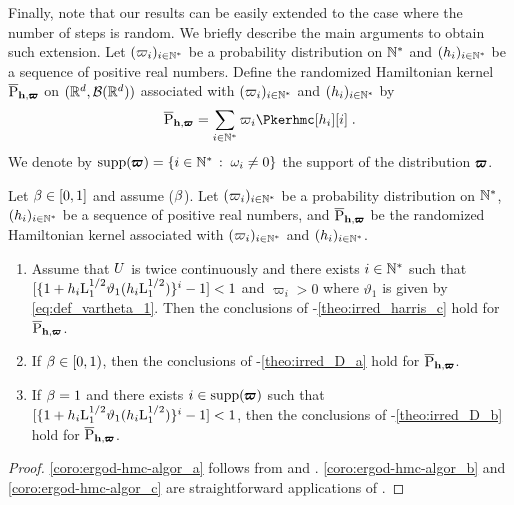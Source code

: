 Finally, note that our results can be easily extended to the case
where the number of steps is random. We briefly describe the main arguments to obtain such
extension.
Let $(\varpi_i)_{i\in \mathbb{N}^*}$ be a probability distribution on $\mathbb{N}^*$ and $(h_i)_{i \in \mathbb{N}^*}$ be a sequence of  positive real
numbers.  Define the randomized Hamiltonian kernel
$\overline{\mathrm{P}}_{\mathbf{h},\pmb{\varpi}}$ on $(\mathbb{R}^d, \mathcal{B}(\mathbb{R}^d))$ associated with $(\varpi_i)_{i\in \mathbb{N}^*}$ and
$(h_i)_{i \in \mathbb{N}^*}$ by
\begin{equation}
\label{eq:randomhmc}
\randomkerhmc_{\mathbf{h},\bfvarpi} = \sum_{i\in \nset^*} \varpi_i \Pkerhmc[h_i][i] \eqsp.
\end{equation}
We denote by $\operatorname{supp}(\pmb{\varpi})= \left\{i \in \mathbb{N}^*\,:\; \omega_i \ne 0\right\}$ the support of the distribution $\pmb{\varpi}$.
\begin{corollary}
  \label{coro:ergod-hmc-algor}
Let $\beta \in \left[0,1\right]$ and assume ($\beta$).
Let $(\varpi_i)_{i\in \mathbb{N}^*}$ be a probability distribution on $\mathbb{N}^*$, $(h_i)_{i \in \mathbb{N}^*}$ be a sequence of  positive real
numbers, and $\overline{\mathrm{P}}_{\mathbf{h},\pmb{\varpi}}$ be the randomized Hamiltonian kernel associated with $(\varpi_i)_{i\in \mathbb{N}^*}$ and
$(h_i)_{i \in \mathbb{N}^*}$.
\begin{enumerate}[label=(\alph*)]
\item
\label{coro:ergod-hmc-algor_a}
Assume that $U$ is twice continuously and there exists $i \in \mathbb{N}^*$ such that   $ [ \{1 + h_i\mathrm{L}_1^{1/2} \vartheta_1( h_i \mathrm{L}_1^{1/2}) \}^i - 1 ] < 1$ and  $\varpi_i > 0$   where $\vartheta_1$ is given by  \eqref{eq:def_vartheta_1}. Then the conclusions  of -\ref{theo:irred_harris_c} hold for $\overline{\mathrm{P}}_{\mathbf{h},\pmb{\varpi}}$.
\item
\label{coro:ergod-hmc-algor_b}
 If $\beta \in \left[0,1\right)$, then the conclusions of -\ref{theo:irred_D_a} hold for $\overline{\mathrm{P}}_{\mathbf{h},\pmb{\varpi}}$.
\item
\label{coro:ergod-hmc-algor_c}
 If $\beta = 1$ and there exists $i \in \operatorname{supp}(\pmb{\varpi})$ such that  $ [ \{1 + h_i \mathrm{L}_1^{1/2} \vartheta_1(h_i \mathrm{L}_1^{1/2}) \}^i - 1 ] < 1$, then the conclusions of -\ref{theo:irred_D_b} hold for $\overline{\mathrm{P}}_{\mathbf{h},\pmb{\varpi}}$.
\end{enumerate}
\end{corollary}

\begin{proof}
  \ref{coro:ergod-hmc-algor_a} follows from  and . \ref{coro:ergod-hmc-algor_b} and \ref{coro:ergod-hmc-algor_c} are straightforward applications of .
\end{proof}

